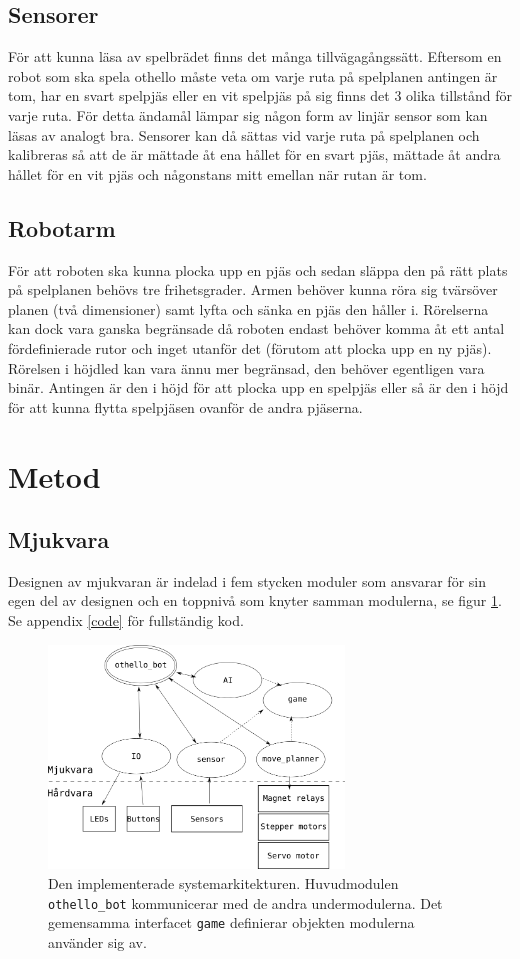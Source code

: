 \documentclass[a4paper]{article}
\begin{document}
\subsection{Sensorer}
För att kunna läsa av spelbrädet finns det många tillvägagångssätt.
Eftersom en robot som ska spela othello måste veta om varje ruta på spelplanen antingen är tom, har en svart spelpjäs eller en vit spelpjäs på sig finns det 3 olika tillstånd för varje ruta.
För detta ändamål lämpar sig någon form av linjär sensor som kan läsas av analogt bra.
Sensorer kan då sättas vid varje ruta på spelplanen och kalibreras så att de är mättade åt ena hållet för en svart pjäs,  mättade åt andra hållet för en vit pjäs och någonstans mitt emellan när rutan är tom.

\subsection{Robotarm}
För att roboten ska kunna plocka upp en pjäs och sedan släppa den på rätt plats på spelplanen behövs tre frihetsgrader.
Armen behöver kunna röra sig tvärsöver planen (två dimensioner) samt lyfta och sänka en pjäs den håller i.
Rörelserna kan dock vara ganska begränsade då roboten endast behöver komma åt ett antal fördefinierade rutor och inget utanför det (förutom att plocka upp en ny pjäs).
Rörelsen i höjdled kan vara ännu mer begränsad, den behöver egentligen vara binär.
Antingen är den i höjd för att plocka upp en spelpjäs eller så är den i höjd för att kunna flytta spelpjäsen ovanför de andra pjäserna.

\section{Metod}
\subsection{Mjukvara}
Designen av mjukvaran är indelad i fem stycken moduler som ansvarar för sin egen del av designen och en toppnivå som knyter samman modulerna, se figur \ref{system_arch}.
Se appendix \ref{code} för fullständig kod.
\begin{figure}
\centering
\includegraphics[width=0.7\textwidth]{system_arch}
\caption{Den implementerade systemarkitekturen. Huvudmodulen \texttt{othello\_bot} kommunicerar med de andra undermodulerna. Det gemensamma interfacet \texttt{game} definierar objekten modulerna använder sig av.}
\label{system_arch}
\end{figure}
\end{document}
